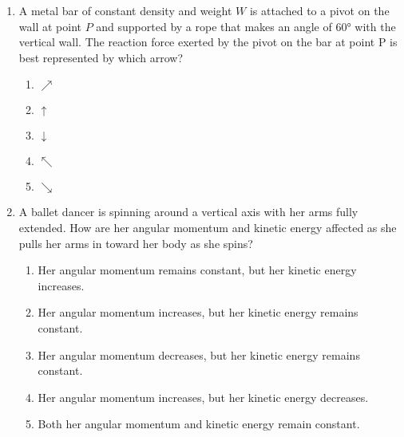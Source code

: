 \documentclass{../../../oss-classkick}
\begin{document}
\begin{multicols*}{2}
\begin{enumerate}[leftmargin=18pt]
    
  \item A metal bar of constant density and weight $W$ is attached to a pivot on
    the wall at point $P$ and supported by a rope that makes an angle of
    \ang{60} with the vertical wall. The reaction force exerted by the pivot on
    the bar at point P is best represented by which arrow?
    \begin{center}
    \end{center}
    \begin{enumerate}[itemsep=4.5pt,topsep=0pt,leftmargin=18pt,label=(\Alph*)]
    \item{\Large $\nearrow$}
    \item{\Large $\uparrow$}
    \item{\Large $\downarrow$}
    \item{\Large $\nwarrow$}
    \item{\Large $\searrow$}
    \end{enumerate}


  \item A ballet dancer is spinning around a vertical axis with her arms fully
    extended. How are her angular momentum and kinetic energy affected
    as she pulls her arms in toward her body as she spins?
    \begin{enumerate}[noitemsep,topsep=0pt,leftmargin=18pt,label=(\Alph*)]
    \item Her angular momentum remains constant, but her kinetic energy
      increases.
    \item Her angular momentum increases, but her kinetic energy remains
      constant.
    \item Her angular momentum decreases, but her kinetic energy remains
      constant.
    \item Her angular momentum increases, but her kinetic energy decreases.
    \item Both her angular momentum and kinetic energy remain constant.
    \end{enumerate}
    \vspace{.7in}
    

\end{enumerate}
\end{multicols*}
\end{document}
